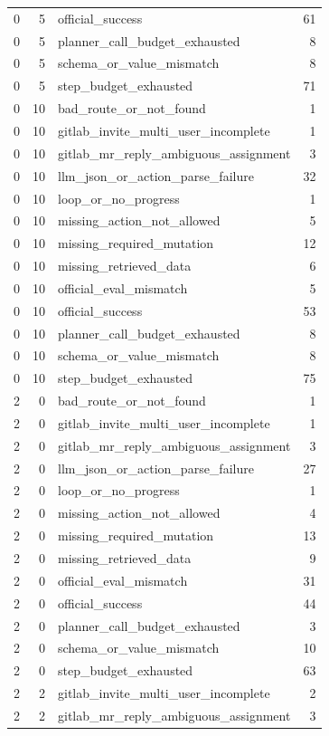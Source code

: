 \begin{tabular}{rrlr}
0 & 5 & official_success & 61 \\
0 & 5 & planner_call_budget_exhausted & 8 \\
0 & 5 & schema_or_value_mismatch & 8 \\
0 & 5 & step_budget_exhausted & 71 \\
0 & 10 & bad_route_or_not_found & 1 \\
0 & 10 & gitlab_invite_multi_user_incomplete & 1 \\
0 & 10 & gitlab_mr_reply_ambiguous_assignment & 3 \\
0 & 10 & llm_json_or_action_parse_failure & 32 \\
0 & 10 & loop_or_no_progress & 1 \\
0 & 10 & missing_action_not_allowed & 5 \\
0 & 10 & missing_required_mutation & 12 \\
0 & 10 & missing_retrieved_data & 6 \\
0 & 10 & official_eval_mismatch & 5 \\
0 & 10 & official_success & 53 \\
0 & 10 & planner_call_budget_exhausted & 8 \\
0 & 10 & schema_or_value_mismatch & 8 \\
0 & 10 & step_budget_exhausted & 75 \\
2 & 0 & bad_route_or_not_found & 1 \\
2 & 0 & gitlab_invite_multi_user_incomplete & 1 \\
2 & 0 & gitlab_mr_reply_ambiguous_assignment & 3 \\
2 & 0 & llm_json_or_action_parse_failure & 27 \\
2 & 0 & loop_or_no_progress & 1 \\
2 & 0 & missing_action_not_allowed & 4 \\
2 & 0 & missing_required_mutation & 13 \\
2 & 0 & missing_retrieved_data & 9 \\
2 & 0 & official_eval_mismatch & 31 \\
2 & 0 & official_success & 44 \\
2 & 0 & planner_call_budget_exhausted & 3 \\
2 & 0 & schema_or_value_mismatch & 10 \\
2 & 0 & step_budget_exhausted & 63 \\
2 & 2 & gitlab_invite_multi_user_incomplete & 2 \\
2 & 2 & gitlab_mr_reply_ambiguous_assignment & 3 \\

\end{tabular}

